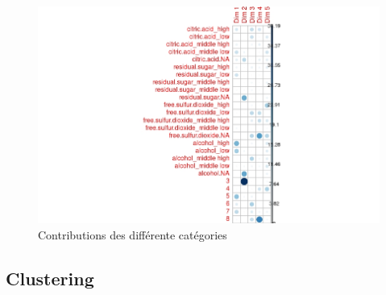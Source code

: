 \documentclass[11pt,a4paper]{article}
\begin{document}
\begin{figure}

\includegraphics[width=\textwidth,keepaspectratio]{contrib}

\caption{Contributions des différente catégories}
\label{fig:contrib}
\end{figure}

\subsection{Clustering}
\end{document}
